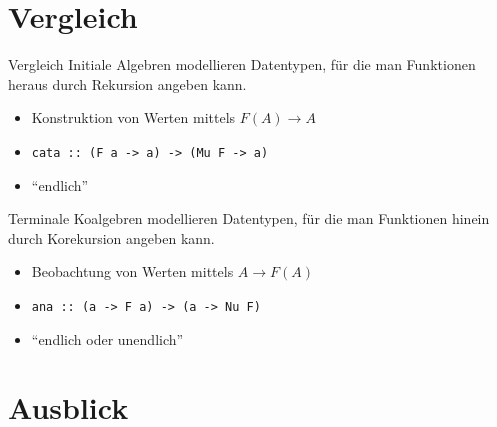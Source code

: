 \documentclass[12pt,compress,ngerman,utf8,t]{beamer}
\begin{document}
\section{Vergleich}

\begin{frame}[fragile]{Vergleich}
  Initiale Algebren modellieren Datentypen, für die man Funktionen
  heraus durch Rekursion angeben kann.
  
  \begin{itemize}
    \item Konstruktion von Werten mittels $F(A) \to A$
    \item \texttt{cata :: (F a -> a) -> (Mu F -> a)}
    \item "`endlich"'
  \end{itemize}

  \bigskip

  Terminale Koalgebren modellieren Datentypen, für die man Funktionen
  hinein durch Korekursion angeben kann.

  \begin{itemize}
    \item Beobachtung von Werten mittels $A \to F(A)$
    \item \texttt{ana :: (a -> F a) -> (a -> Nu F)}
    \item "`endlich oder unendlich"'
  \end{itemize}
\end{frame}


\section{Ausblick}
\end{document}
